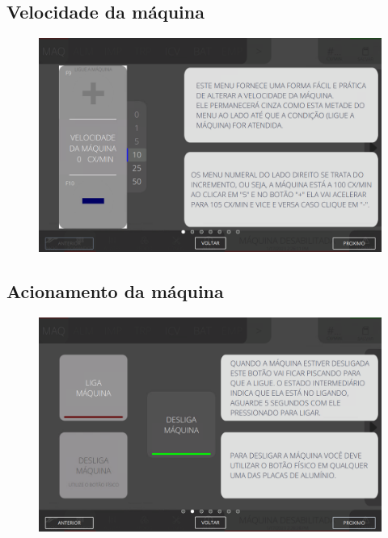 \subsection{Velocidade da máquina}
\begin{figure}
    \centering
    \includegraphics[width=576 px,height=360 px]{src/imagesICV/02-machine/2.png}
\end{figure}
\newpage
\thispagestyle{fancy}
\vspace{\fill}

\subsection{Acionamento da máquina}
\begin{figure}
    \centering
    \includegraphics[width=576 px,height=360 px]{src/imagesICV/02-machine/3.png}
\end{figure}
\newpage
\thispagestyle{fancy}
\vspace{\fill}

